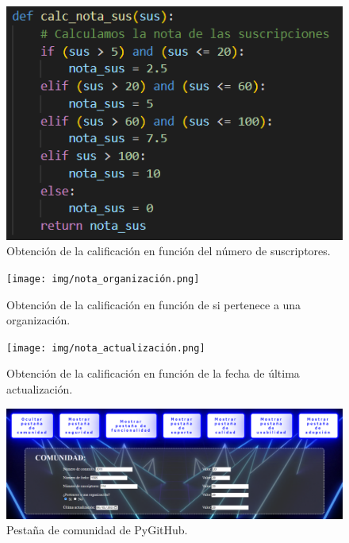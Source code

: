 \documentclass[a4paper, 12pt]{book}
\begin{document}
\begin{figure}
    \centering
    \includegraphics[width=1\textwidth, keepaspectratio]{img/nota_suscriptores.png}
    \caption{Obtención de la calificación en función del número de suscriptores.}\label{fig:nota_suscriptores}
\end{figure}
\begin{figure}
    \centering
    \texttt{[image: img/nota\_organización.png]}
    \caption{Obtención de la calificación en función de si pertenece a una organización.}\label{fig:nota_organización}
\end{figure}
\begin{figure}
    \centering
    \texttt{[image: img/nota\_actualización.png]}
    \caption{Obtención de la calificación en función de la fecha de última actualización.}\label{fig:nota_actualización}
\end{figure}

\begin{figure}
    \centering
    \includegraphics[width=1\textwidth, keepaspectratio]{img/pygithub_comunidad.png}
    \caption{Pestaña de comunidad de PyGitHub.}\label{fig:comunidad_pygithub}
\end{figure}
\end{document}
